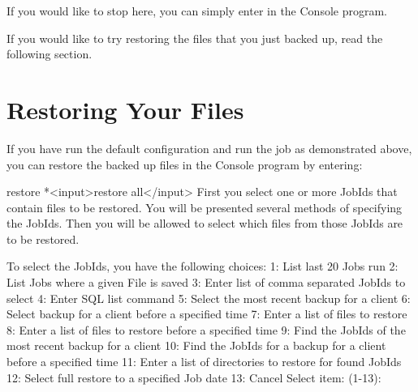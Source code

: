 
If you would like to stop here, you can simply enter  in the Console
program.

% 
% 

If you would like to try restoring the files that you just backed up, read the
following section.
\label{restoring}

\section{Restoring Your Files}

If you have run the default configuration and run the job as demonstrated above,
you can restore the backed up files in the Console
program by entering:

\begin{bconsole}{restore}
*<input>restore all</input>
First you select one or more JobIds that contain files
to be restored. You will be presented several methods
of specifying the JobIds. Then you will be allowed to
select which files from those JobIds are to be restored.

To select the JobIds, you have the following choices:
     1: List last 20 Jobs run
     2: List Jobs where a given File is saved
     3: Enter list of comma separated JobIds to select
     4: Enter SQL list command
     5: Select the most recent backup for a client
     6: Select backup for a client before a specified time
     7: Enter a list of files to restore
     8: Enter a list of files to restore before a specified time
     9: Find the JobIds of the most recent backup for a client
    10: Find the JobIds for a backup for a client before a specified time
    11: Enter a list of directories to restore for found JobIds
    12: Select full restore to a specified Job date
    13: Cancel
Select item:  (1-13):
\end{bconsole}


